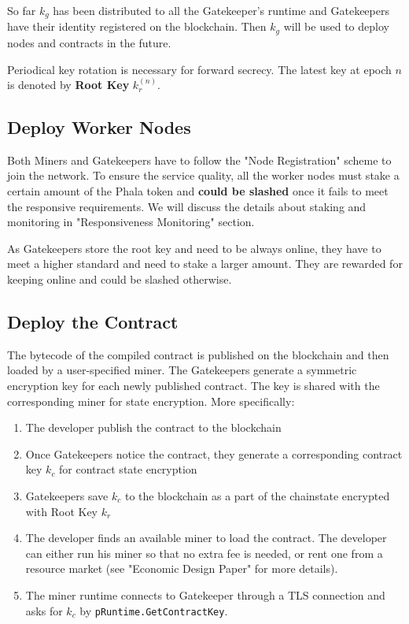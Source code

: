 So far $k_g$ has been distributed to all the Gatekeeper's runtime and Gatekeepers have their identity registered on the blockchain. Then $k_g$ will be used to deploy nodes and contracts in the future.

Periodical key rotation is necessary for forward secrecy. The latest key at epoch $n$ is denoted by \textbf{Root Key} $k_r^{(n)}$.

\subsection{Deploy Worker Nodes}

Both Miners and Gatekeepers have to follow the "Node Registration" scheme to join the network. To ensure the service quality, all the worker nodes must stake a certain amount of the Phala token and \textbf{could be slashed} once it fails to meet the responsive requirements. We will discuss the details about staking and monitoring in "Responsiveness Monitoring" section.

As Gatekeepers store the root key and need to be always online, they have to meet a higher standard and need to stake a larger amount. They are rewarded for keeping online and could be slashed otherwise.


\subsection{Deploy the Contract}

The bytecode of the compiled contract is published on the blockchain and then loaded by a user-specified miner. The Gatekeepers generate a symmetric encryption key for each newly published contract. The key is shared with the corresponding miner for state encryption. More specifically:

\begin{enumerate}
    \item The developer publish the contract to the blockchain
    \item Once Gatekeepers notice the contract, they generate a corresponding contract key $k_c$ for contract state encryption
    \item Gatekeepers save $k_c$ to the blockchain as a part of the chainstate encrypted with Root Key $k_r$
    \item The developer finds an available miner to load the contract. The developer can either run his miner so that no extra fee is needed, or rent one from a resource market (see "Economic Design Paper" for more details).
    \item The miner runtime connects to Gatekeeper through a TLS connection and asks for $k_c$ by \texttt{pRuntime.GetContractKey}.
\end{enumerate}

